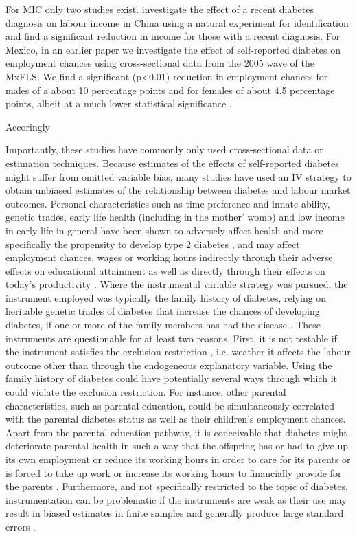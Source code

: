 For \ac{MIC} only two studies exist. \citet{Liu2014} investigate the effect of a recent diabetes diagnosis on labour income
in China using a natural experiment for identification and find a
significant reduction in income for those with a recent diagnosis.
For Mexico, in an earlier paper we investigate the effect of self-reported
diabetes on employment chances using cross-sectional data from the
2005 wave of the \ac{MxFLS}. We find a significant (p<0.01) reduction
in employment chances for males of a about 10 percentage points and
for females of about 4.5 percentage points, albeit at a much lower
statistical significance \citep{Seuring2015}.

Accoringly

Importantly, these studies have commonly only used cross-sectional
data or estimation techniques. Because estimates of the effects of self-reported diabetes might
suffer from omitted variable bias, many studies have used an \ac{IV}
strategy to obtain unbiased estimates of the relationship between
diabetes and labour market outcomes. Personal characteristics such
as time preference and innate ability, genetic trades, early life
health (including in the mother' womb) and low income in early life
in general have been shown to adversely affect health and more specifically
the propensity to develop type 2 diabetes \citep{VanEwijk2011a,Sotomayor2013,Li2010b},
and may affect employment chances, wages or working hours indirectly
through their adverse effects on educational attainment \citep{Ayyagari2011b}
as well as directly through their effects on today's productivity
\citep{Currie2013}. Where the instrumental variable strategy was
pursued, the instrument employed was typically the family history
of diabetes, relying on heritable genetic trades of diabetes that
increase the chances of developing diabetes, if one or more of the family members
has had the disease \citep{Brown2005,Latif2009,Minor2010a,Lin2011b,Seuring2015}.
These instruments are questionable for at least two reasons. First,
it is not testable if the instrument satisfies the exclusion restriction
 , i.e. weather it affects the labour outcome other than through
the endogeneous explanatory variable. Using the family history of diabetes could have potentially several ways through which it could violate the exclusion restriction. For instance, other parental characteristics, such as parental education, could be simultaneously correlated with the parental diabetes status as well as their children’s
employment chances. Apart from the parental education pathway, it is conceivable that diabetes might deteriorate parental health in such a way that the offspring has or had to give
up its own employment or reduce its working hours in order to care for its parents or is forced to take up work or increase its working hours to financially provide for the parents \citet{Seuring2015}. Furthermore, and not specifically restricted to the topic of diabetes, instrumentation can be problematic if the instruments are weak as their use may result in biased estimates in finite samples and generally produce large standard errors \citep{Bound1995}. 

